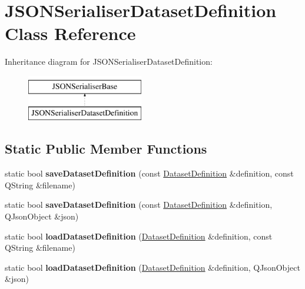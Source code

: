 \hypertarget{class_j_s_o_n_serialiser_dataset_definition}{}\section{J\+S\+O\+N\+Serialiser\+Dataset\+Definition Class Reference}
\label{class_j_s_o_n_serialiser_dataset_definition}
Inheritance diagram for J\+S\+O\+N\+Serialiser\+Dataset\+Definition\+:\begin{figure}[H]
\begin{center}
\leavevmode
\includegraphics[height=2.000000cm]{class_j_s_o_n_serialiser_dataset_definition}
\end{center}
\end{figure}
\subsection*{Static Public Member Functions}
\begin{DoxyCompactItemize}
\item 
\mbox{\label{class_j_s_o_n_serialiser_dataset_definition_ae1deb137561e23d12c00f1e32ba31908}} 
static bool {\bfseries save\+Dataset\+Definition} (const \hyperlink{class_dataset_definition}{Dataset\+Definition} \&definition, const Q\+String \&filename)
\item 
\mbox{\label{class_j_s_o_n_serialiser_dataset_definition_a739265a594be908d91ed5fa6973f28de}} 
static bool {\bfseries save\+Dataset\+Definition} (const \hyperlink{class_dataset_definition}{Dataset\+Definition} \&definition, Q\+Json\+Object \&json)
\item 
\mbox{\label{class_j_s_o_n_serialiser_dataset_definition_aa7ff049677cc75468fd4f61fff3bce79}} 
static bool {\bfseries load\+Dataset\+Definition} (\hyperlink{class_dataset_definition}{Dataset\+Definition} \&definition, const Q\+String \&filename)
\item 
\mbox{\label{class_j_s_o_n_serialiser_dataset_definition_aa4f4f3f1a536b9314d2fae332983452a}} 
static bool {\bfseries load\+Dataset\+Definition} (\hyperlink{class_dataset_definition}{Dataset\+Definition} \&definition, Q\+Json\+Object \&json)
\end{DoxyCompactItemize}


